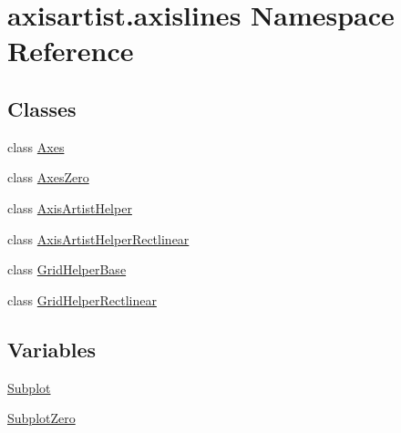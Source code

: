 \hypertarget{namespaceaxisartist_1_1axislines}{}\section{axisartist.\+axislines Namespace Reference}
\label{namespaceaxisartist_1_1axislines}
\subsection*{Classes}
\begin{DoxyCompactItemize}
\item 
class \hyperlink{classaxisartist_1_1axislines_1_1Axes}{Axes}
\item 
class \hyperlink{classaxisartist_1_1axislines_1_1AxesZero}{Axes\+Zero}
\item 
class \hyperlink{classaxisartist_1_1axislines_1_1AxisArtistHelper}{Axis\+Artist\+Helper}
\item 
class \hyperlink{classaxisartist_1_1axislines_1_1AxisArtistHelperRectlinear}{Axis\+Artist\+Helper\+Rectlinear}
\item 
class \hyperlink{classaxisartist_1_1axislines_1_1GridHelperBase}{Grid\+Helper\+Base}
\item 
class \hyperlink{classaxisartist_1_1axislines_1_1GridHelperRectlinear}{Grid\+Helper\+Rectlinear}
\end{DoxyCompactItemize}
\subsection*{Variables}
\begin{DoxyCompactItemize}
\item 
\hyperlink{namespaceaxisartist_1_1axislines_ae7bdfebb18ec851f930dd0f32cb803eb}{Subplot}
\item 
\hyperlink{namespaceaxisartist_1_1axislines_aec71ec41722b964a8f2081c7025eabfa}{Subplot\+Zero}
\end{DoxyCompactItemize}


